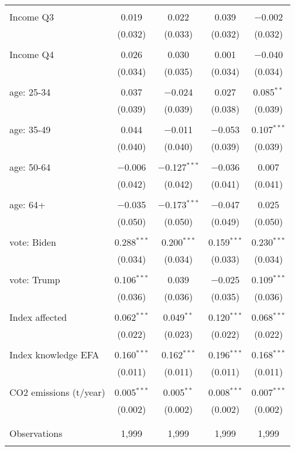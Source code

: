 \begin{tabular}{@{\extracolsep{5pt}}lcccc}
  & & & & \\ 
 Income Q3 & 0.019 & 0.022 & 0.039 & $-$0.002 \\ 
  & (0.032) & (0.033) & (0.032) & (0.032) \\ 
  & & & & \\ 
 Income Q4 & 0.026 & 0.030 & 0.001 & $-$0.040 \\ 
  & (0.034) & (0.035) & (0.034) & (0.034) \\ 
  & & & & \\ 
 age: 25-34 & 0.037 & $-$0.024 & 0.027 & 0.085$^{**}$ \\ 
  & (0.039) & (0.039) & (0.038) & (0.039) \\ 
  & & & & \\ 
 age: 35-49 & 0.044 & $-$0.011 & $-$0.053 & 0.107$^{***}$ \\ 
  & (0.040) & (0.040) & (0.039) & (0.039) \\ 
  & & & & \\ 
 age: 50-64 & $-$0.006 & $-$0.127$^{***}$ & $-$0.036 & 0.007 \\ 
  & (0.042) & (0.042) & (0.041) & (0.041) \\ 
  & & & & \\ 
 age: 64+ & $-$0.035 & $-$0.173$^{***}$ & $-$0.047 & 0.025 \\ 
  & (0.050) & (0.050) & (0.049) & (0.050) \\ 
  & & & & \\ 
 vote: Biden & 0.288$^{***}$ & 0.200$^{***}$ & 0.159$^{***}$ & 0.230$^{***}$ \\ 
  & (0.034) & (0.034) & (0.033) & (0.034) \\ 
  & & & & \\ 
 vote: Trump & 0.106$^{***}$ & 0.039 & $-$0.025 & 0.109$^{***}$ \\ 
  & (0.036) & (0.036) & (0.035) & (0.036) \\ 
  & & & & \\ 
 Index affected & 0.062$^{***}$ & 0.049$^{**}$ & 0.120$^{***}$ & 0.068$^{***}$ \\ 
  & (0.022) & (0.023) & (0.022) & (0.022) \\ 
  & & & & \\ 
 Index knowledge EFA & 0.160$^{***}$ & 0.162$^{***}$ & 0.196$^{***}$ & 0.168$^{***}$ \\ 
  & (0.011) & (0.011) & (0.011) & (0.011) \\ 
  & & & & \\ 
 CO2 emissions (t/year) & 0.005$^{***}$ & 0.005$^{**}$ & 0.008$^{***}$ & 0.007$^{***}$ \\ 
  & (0.002) & (0.002) & (0.002) & (0.002) \\ 
  & & & & \\ 
\hline \\[-1.8ex] 

Observations & 1,999 & 1,999 & 1,999 & 1,999 \\ 
\hline 
\hline \\[-1.8ex] 
\end{tabular} 